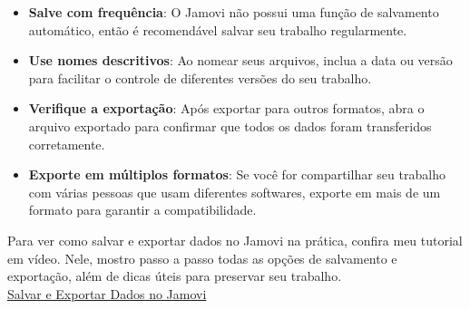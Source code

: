 \begin{itemize}
    \item \textbf{Salve com frequência}: O Jamovi não possui uma função de salvamento automático, então é recomendável salvar seu trabalho regularmente.
    \item \textbf{Use nomes descritivos}: Ao nomear seus arquivos, inclua a data ou versão para facilitar o controle de diferentes versões do seu trabalho.
    \item \textbf{Verifique a exportação}: Após exportar para outros formatos, abra o arquivo exportado para confirmar que todos os dados foram transferidos corretamente.
    \item \textbf{Exporte em múltiplos formatos}: Se você for compartilhar seu trabalho com várias pessoas que usam diferentes softwares, exporte em mais de um formato para garantir a compatibilidade.
\end{itemize}

\begin{tcolorbox}[colback=white,colframe=red,title={\faPlayCircle \ Dica de Conteúdo}]
  Para ver como salvar e exportar dados no Jamovi na prática, confira meu tutorial em vídeo. Nele, mostro passo a passo todas as opções de salvamento e exportação, além de dicas úteis para preservar seu trabalho.\\
  \textcolor{red}{\faYoutube} \href{https://youtu.be/NIpt0wIq5pc?si=cqwzo5swixILk2rU}{Salvar e Exportar Dados no Jamovi}
\end{tcolorbox}

